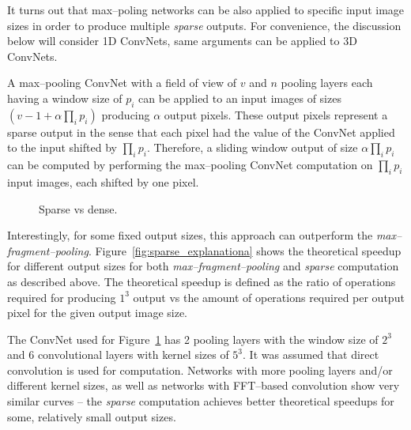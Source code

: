 \documentclass[conference]{IEEEtran}
\begin{document}
  It turns out that max--poling networks can be also applied to
  specific input image sizes in order to produce multiple
  \emph{sparse} outputs.  For convenience, the discussion below will
  consider 1D ConvNets, same arguments can be applied to 3D ConvNets.

  A max--pooling ConvNet with a field of view of $v$ and $n$ pooling
  layers each having a window size of $p_i$ can be applied to an input
  images of sizes $(v - 1 + \alpha \prod_{i} p_i)$ producing $\alpha$
  output pixels.  These output pixels represent a sparse output in the
  sense that each pixel had the value of the ConvNet applied to the
  input shifted by $\prod_{i} p_i$.  Therefore, a sliding window
  output of size $\alpha \prod_{i} p_i$ can be computed by performing
  the max--pooling ConvNet computation on $\prod_{i} p_i$ input
  images, each shifted by one pixel.

  \begin{figure}
    \centering
    \caption{Sparse vs dense.}
    \label{fig:sparse_explanation}
  \end{figure}

  Interestingly, for some fixed output sizes, this approach can
  outperform the \emph{max--fragment--pooling}.
  Figure~\ref{fig:sparse_explanationa} shows the theoretical speedup
  for different output sizes for both \emph{max--fragment--pooling}
  and \emph{sparse} computation as described above.  The theoretical
  speedup is defined as the ratio of operations required for producing
  $1^3$ output vs the amount of operations required per output pixel
  for the given output image size.

  The ConvNet used for Figure~\ref{fig:sparse_explanation} has 2
  pooling layers with the window size of $2^3$ and 6 convolutional
  layers with kernel sizes of $5^3$.  It was assumed that direct
  convolution is used for computation.  Networks with more pooling
  layers and/or different kernel sizes, as well as networks with
  FFT--based convolution show very similar curves -- the \emph{sparse}
  computation achieves better theoretical speedups for some,
  relatively small output sizes.
\end{document}
